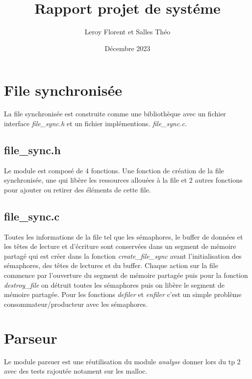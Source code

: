 \documentclass[12pt]{article}
\title{Rapport projet de systéme}
\author{Leroy Florent et Salles Théo}
\date{Décembre 2023}
\begin{document}
\maketitle
\tableofcontents
\newpage
\section{File synchronisée}
La file synchronisée est construite comme une bibliothèque avec un fichier
interface \textit{file\_sync.h} et un fichier implémentions.
\textit{file\_sync.c}.
\subsection{file\_sync.h}
Le module est composé de 4 fonctions. Une fonction de création de la file
synchronisée, une qui libère les ressources allouées à la file et 2 autres
fonctions pour ajouter
ou retirer des éléments de cette file.
\subsection{file\_sync.c}
Toutes les informations de la file tel que les sémaphores, le buffer de données et les
têtes de lecture
et d'écriture sont conservées dans un segment de mémoire partagé qui est créer
dans la fonction \textit{create\_file\_sync} avant l'initialisation des
sémaphores,
des têtes de lectures et du buffer.
Chaque action sur la file commence par l'ouverture du segment de mémoire
partagée
puis pour la fonction \textit{destroy\_file} on détruit toutes les sémaphores
puis on libère le segment de mémoire partagée. Pour les fonctions
\textit{defiler} et \textit{enfiler}
c'est un simple problème consommateur/producteur avec les sémaphores.
\section{Parseur}
Le module parsuer est une réutilisation du module \textit{analyse} donner lors du tp 2
avec des tests rajoutée notament sur les malloc.
\end{document}
